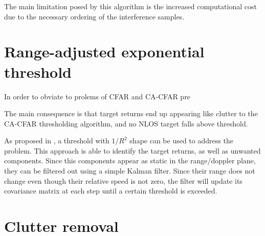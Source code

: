 The main limitation posed by this algorithm is the increased computational cost due to the necessary ordering of the interference samples.


\section{Range-adjusted exponential threshold}

	
	In order to obviate to prolems of CFAR and CA-CFAR pre
	
	
	The main consequence is that target returns end up appearing like clutter to the CA-CFAR thresholding algorithm, and no NLOS target falls above threshold.
	
	As proposed in \cite{Wagner_Feger_Stelzer_2017}, a threshold with $1/R^2$ shape can be used to address the problem. This approach is able to identify the target returns, as well as unwanted components. Since this components appear as static in the range/doppler plane, they can be filtered out using a simple Kalman filter. Since their range does not change even though their relative speed is not zero, the filter will update its covariance matrix at each step until a certain threshold is exceeded.

\section{Clutter removal}





